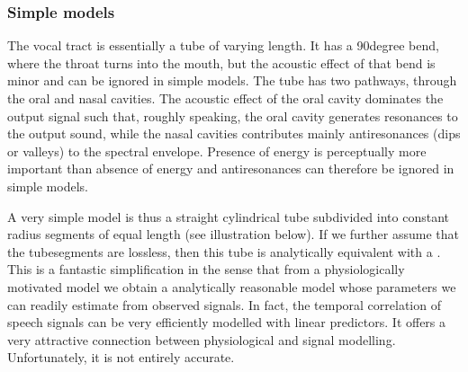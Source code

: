 \documentclass[letterpaper,10pt,english]{jupyterBook}
\begin{document}
\subsubsection{Simple models}
\label{\detokenize{Introduction/Speech_production_and_acoustic_properties:simple-models}}
\sphinxAtStartPar
The vocal tract is essentially a tube of varying length. It has a
90\sphinxhyphen{}degree bend, where the throat turns into the mouth, but the acoustic
effect of that bend is minor and can be ignored in simple models. The
tube has two pathways, through the oral and nasal cavities. The acoustic
effect of the oral cavity dominates the output signal such that, roughly
speaking, the oral cavity generates resonances to the output sound,
while the nasal cavities contributes mainly anti\sphinxhyphen{}resonances (dips or
valleys) to the spectral envelope. Presence of energy is perceptually
more important than absence of energy and anti\sphinxhyphen{}resonances can therefore
be ignored in simple models.

\sphinxAtStartPar
A very simple model is thus a straight cylindrical tube sub\sphinxhyphen{}divided into
constant radius segments of equal length (see illustration below). If we further assume that the tube\sphinxhyphen{}segments are lossless, then
this tube is analytically equivalent with a . This is a fantastic simplification in the
sense that from a physiologically motivated model we obtain a
analytically reasonable model whose parameters we can readily estimate
from observed signals. In fact, the temporal correlation of speech
signals can be very efficiently modelled with linear predictors. It
offers a very attractive connection between physiological and signal
modelling. Unfortunately, it is not entirely accurate.
\end{document}
